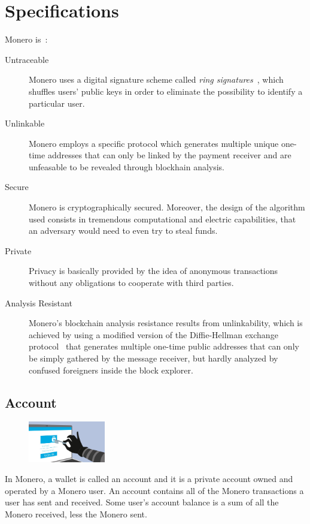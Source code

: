\section{Specifications}
Monero is~\cite{monero}:
\begin{description}
  \item [Untraceable] Monero uses a digital signature scheme called \emph{ring signatures}~\cite{ringCT}, which shuffles users' public keys in order to eliminate the possibility to identify a particular user.
  \item [Unlinkable] Monero employs a specific protocol which generates multiple unique one-time addresses that can only be linked by the payment receiver and are unfeasable to be revealed through blockhain analysis.
  \item [Secure] Monero is cryptographically secured. Moreover, the design of the algorithm used consists in tremendous computational and electric capabilities, that an adversary would need to even try to steal funds.
  \item [Private] Privacy is basically provided by the idea of anonymous transactions without any obligations to cooperate with third parties.
  \item [Analysis Resistant] Monero's blockchain analysis resistance results from unlinkability, which is achieved by using a modified version of the Diffie-Hellman exchange protocol~\cite{Diffie:2006:NDC:2263321.2269104} that generates multiple one-time public addresses that can only be simply gathered by the message receiver, but hardly analyzed by confused foreigners inside the block explorer.
\end{description}
\pagebreak

\subsection{Account}
\begin{figure}
\centering
\includegraphics[width=0.3\textwidth]{Images/Monero/account.jpg}
\end{figure}
In Monero, a wallet is called an account and it is a private account owned and operated by a Monero user. An account contains all of the Monero transactions a user has sent and received. Some user's account balance is a sum of all the Monero received, less the Monero sent.

